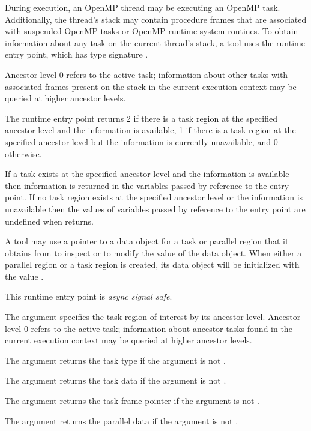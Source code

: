 \descr
During execution, an OpenMP thread may be executing an OpenMP task.
Additionally, the thread's stack may contain procedure frames that 
are associated with suspended OpenMP tasks or OpenMP runtime system 
routines. To obtain information about any task on the current thread's 
stack, a tool uses the  runtime entry point,
which has type signature .

Ancestor level 0 refers to the active task; information about other 
tasks with associated frames present on the stack in the current execution 
context may be queried at higher ancestor levels.

The  runtime entry point returns 2 if there 
is a task region at the specified ancestor level and the information 
is available, 1 if there is a task region at the specified ancestor 
level but the information is currently unavailable, and 0 otherwise.

If a task exists at the specified ancestor level and the information is 
available then information is returned in the variables passed by reference 
to the entry point. If no task region exists at the specified ancestor level 
or the information is unavailable then the values of variables passed by 
reference to the entry point are undefined when  returns.

A tool may use a pointer to a data object for a task or parallel region 
that it obtains from  to inspect or to modify the
value of the data object. When either a parallel region or a task region 
is created, its data object will be initialized with the value .

This runtime entry point is \emph{async signal safe}.

\argdesc
The  argument specifies the task region of interest by 
its ancestor level. Ancestor level 0 refers to the active task; information 
about ancestor tasks found in the current execution context may be queried 
at higher ancestor levels.

The  argument returns the task type if the argument is not .

The  argument returns the task data if the argument is not .

The  argument returns the task frame pointer
if the argument is not .

The  argument returns the parallel data
if the argument is not .

